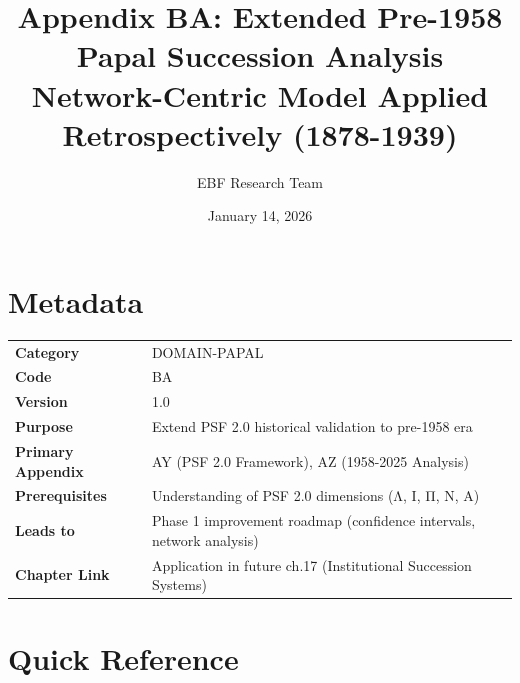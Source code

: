 \documentclass[11pt,a4paper]{article}
\title{Appendix BA: Extended Pre-1958 Papal Succession Analysis\\
Network-Centric Model Applied Retrospectively (1878-1939)}
\author{EBF Research Team}
\date{January 14, 2026}
\begin{document}
\maketitle


\section*{Metadata}

\begin{tabular}{ll}
\textbf{Category} & DOMAIN-PAPAL \\
\textbf{Code} & BA \\
\textbf{Version} & 1.0 \\
\textbf{Purpose} & Extend PSF 2.0 historical validation to pre-1958 era \\
\textbf{Primary Appendix} & AY (PSF 2.0 Framework), AZ (1958-2025 Analysis) \\
\textbf{Prerequisites} & Understanding of PSF 2.0 dimensions (Λ, Ι, Π, Ν, Α) \\
\textbf{Leads to} & Phase 1 improvement roadmap (confidence intervals, network analysis) \\
\textbf{Chapter Link} & Application in future ch.17 (Institutional Succession Systems) \\
\end{tabular}

\vspace{1em}


\section*{Quick Reference}
\end{document}
